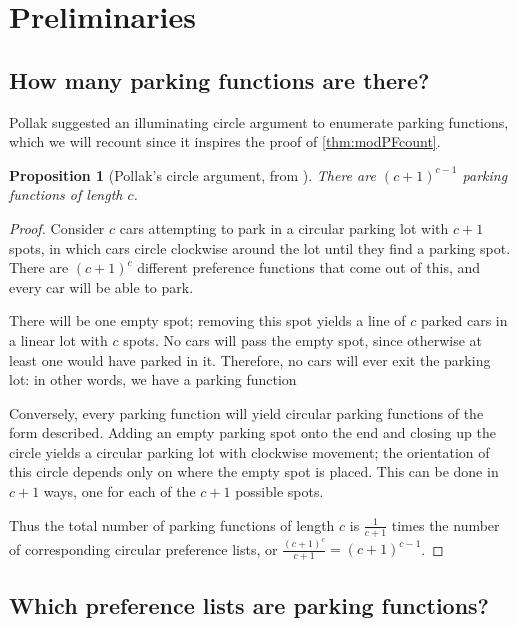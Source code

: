 \documentclass[12 pt]{amsart}
\newtheorem{proposition}[theorem]{Proposition}
\theoremstyle{definition} %
\theoremstyle{remark} %
\begin{document}
\section{Preliminaries} \label{s:prelim}


\subsection{How many parking functions are there?}

Pollak suggested an illuminating circle argument to enumerate parking functions, which we will recount since it inspires the proof of \cref{thm:modPFcount}.

\begin{proposition}[Pollak's circle argument, from \cite{riordan-1969}]
	There are $(c + 1)^{c - 1}$ parking functions of length $c$.
\end{proposition}

\begin{proof}
    Consider $c$ cars attempting to park in a circular parking lot with $c+1$ spots, in which cars circle clockwise around the lot until they find a parking spot. There are $(c+1)^c$ different preference functions that come out of this, and every car will be able to park.

    There will be one empty spot; removing this spot yields a line of $c$ parked cars in a linear lot with $c$ spots. No cars will pass the empty spot, since otherwise at least one would have parked in it. Therefore, no cars will ever exit the parking lot: in other words, we have a parking function
    
    Conversely, every parking function will yield circular parking functions of the form described. Adding an empty parking spot onto the end and closing up the circle yields a circular parking lot with clockwise movement; the orientation of this circle depends only on where the empty spot is placed. This can be done in $c+1$ ways, one for each of the $c+1$ possible spots.

    Thus the total number of parking functions of length $c$ is $\frac{1}{c+1}$ times the number of corresponding circular preference lists, or $\frac{(c+1)^c}{c+1}=(c+1)^{c-1}$.
\end{proof}
	
\subsection{Which preference lists are parking functions?}
\end{document}
